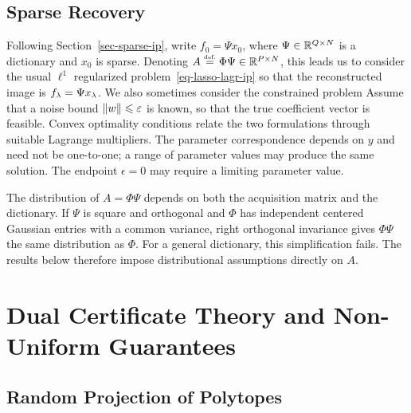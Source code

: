 \subsection{Sparse Recovery}

Following Section~\ref{sec-sparse-ip}, write $f_0=\Psi x_0$, where $\Psi\in\mathbb{R}^{Q\times N}$ is a dictionary and $x_0$ is sparse. Denoting $A\stackrel{\mbox{\upshape\tiny def.}}{=}\Phi\Psi\in\mathbb{R}^{P\times N}$, this leads us to consider the usual $\ell^1$ regularized problem~\eqref{eq-lasso-lagr-ip}
so that the reconstructed image is $f_\lambda = \Psi x_\lambda$. We also sometimes consider the constrained problem
Assume that a noise bound $\lVert w\rVert\leqslant\varepsilon$ is known, so that the true coefficient vector is feasible. Convex optimality conditions relate the two formulations through suitable Lagrange multipliers. The parameter correspondence depends on $y$ and need not be one-to-one; a range of parameter values may produce the same solution. The endpoint $\epsilon=0$ may require a limiting parameter value.

The distribution of $A=\Phi\Psi$ depends on both the acquisition matrix and the dictionary. If $\Psi$ is square and orthogonal and $\Phi$ has independent centered Gaussian entries with a common variance, right orthogonal invariance gives $\Phi\Psi$ the same distribution as $\Phi$. For a general dictionary, this simplification fails. The results below therefore impose distributional assumptions directly on $A$.

\section{Dual Certificate Theory and Non-Uniform Guarantees}
\label{sec-cs-certif}

\subsection{Random Projection of Polytopes}

